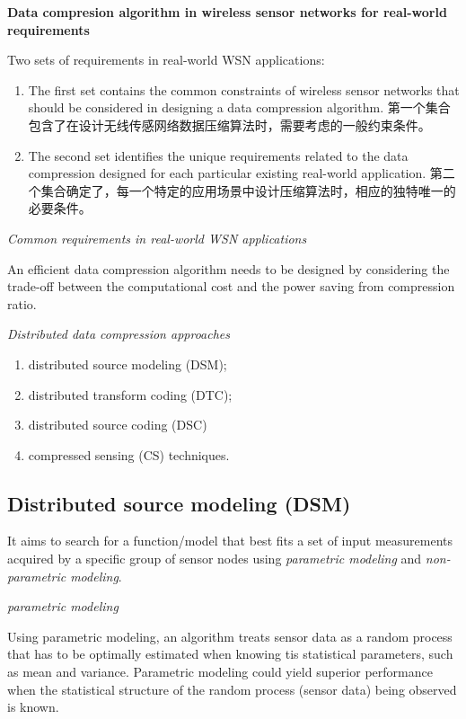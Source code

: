 \textbf{Data compresion algorithm in wireless sensor networks for real-world requirements}

Two sets of requirements in real-world WSN applications:
\begin{enumerate}
    \item The first set contains the common constraints of wireless sensor networks that should be considered in designing a data compression algorithm. 第一个集合包含了在设计无线传感网络数据压缩算法时，需要考虑的一般约束条件。
    \item The second set identifies the unique requirements related to the data compression designed for each particular existing real-world application. 第二个集合确定了，每一个特定的应用场景中设计压缩算法时，相应的独特唯一的必要条件。
\end{enumerate}

\emph{Common requirements in real-world WSN applications}

An efficient data compression algorithm needs to be designed by considering the trade-off between the computational cost and the power saving from compression ratio.

\emph{\textcolor[rgb]{1,0,0}{Distributed data compression approaches}}

\begin{enumerate}
    \item distributed source modeling (DSM);
    \item distributed transform coding (DTC);
    \item distributed source coding (DSC)
    \item compressed sensing (CS) techniques. 
\end{enumerate}

\subsection{Distributed source modeling (DSM)}
It aims to search for a function/model that best fits a set of input measurements acquired by a specific group of sensor nodes using \emph{\textcolor[rgb]{1,0,0}{parametric modeling}} and \emph{\textcolor[rgb]{1,0,0}{non-parametric modeling}}. 

\emph{\textcolor[rgb]{1,0,0}{parametric modeling}}

Using parametric modeling, an algorithm treats sensor data as a \textcolor[rgb]{1,0,0}{random process that has to be optimally estimated when knowing tis statistical parameters}, such as mean and variance. Parametric modeling could yield superior performance when the statistical structure of the random process (sensor data) being observed is known. 

